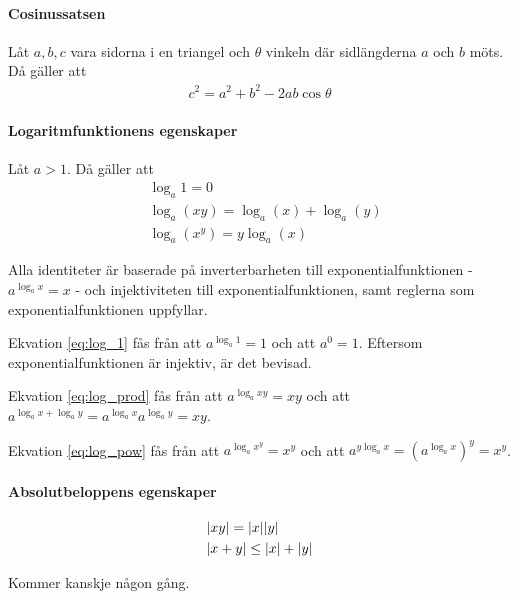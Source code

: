 \paragraph{Cosinussatsen}

Låt $a,b,c$ vara sidorna i en triangel och $\theta$ vinkeln där sidlängderna $a$ och $b$ möts. Då gäller att
\begin{align*}
	c^2=a^2+b^2-2ab\cos\theta
\end{align*}

\paragraph{Logaritmfunktionens egenskaper}

Låt $a > 1$. Då gäller att
\begin{align}
	&\log_a 1 = 0 \label{eq:log_1}\\
	&\log_a\left(xy\right) = \log_a\left(x\right) + \log_a\left(y\right) \label{eq:log_prod}\\
	&\log_a\left(x^y\right) = y\log_a\left(x\right) \label{eq:log_pow}
\end{align}

\proof

Alla identiteter är baserade på inverterbarheten till exponentialfunktionen - $a^{\log_a x} = x$ - och injektiviteten till exponentialfunktionen, samt reglerna som exponentialfunktionen uppfyllar.

Ekvation \ref{eq:log_1} fås från att $a^{\log_a 1} = 1$ och att $a^0 = 1$. Eftersom exponentialfunktionen är injektiv, är det bevisad.

Ekvation \ref{eq:log_prod} fås från att $a^{\log_a xy} = xy$ och att $a^{\log_a x + \log_a y} = a^{\log_a x}a^{\log_a y}=xy$.

Ekvation \ref{eq:log_pow} fås från att $a^{\log_a x^y} = x^y$ och att $a^{y\log_a x} = \left(a^{\log_a x}\right)^y = x^y$.

\paragraph{Absolutbeloppens egenskaper}

\begin{align}
	&\abs{xy} = \abs{x}\abs{y} \label{eq:abs_prod} \\
	&\abs{x + y} \leq \abs{x} + \abs{y} \label{eq:abs_sum}
\end{align}

\proof

Kommer kanskje någon gång.

